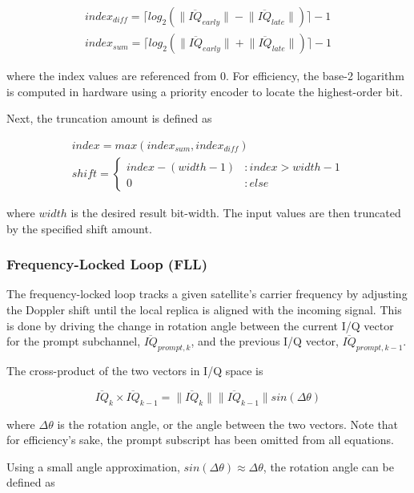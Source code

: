 \documentclass[12pt]{article}
\begin{document}
\begin{gather*}
index_{diff}=\lceil log_2(\lVert \overline{IQ}_{early} \rVert - \lVert \overline{IQ}_{late} \rVert) \rceil - 1 \\
index_{sum}=\lceil log_2(\lVert \overline{IQ}_{early} \rVert + \lVert \overline{IQ}_{late} \rVert) \rceil - 1
\end{gather*}

where the index values are referenced from 0. For efficiency, the base-2 logarithm is computed in hardware using a priority encoder to locate the highest-order bit.

Next, the truncation amount is defined as

\begin{gather*}
index=max(index_{sum},index_{diff}) \\
shift=\begin{cases} index-(width-1) & : index>width-1 \\
                                   0 & : else \end{cases}
\end{gather*}

where $width$ is the desired result bit-width. The input values are then truncated by the specified shift amount.

\subsubsection{Frequency-Locked Loop (FLL)}
\label{sec:fll}
The frequency-locked loop tracks a given satellite's carrier frequency by adjusting the Doppler shift until the local replica is aligned with the incoming signal. This is done by driving the change in rotation angle between the current I/Q vector for the prompt subchannel, $\overline{IQ}_{prompt,k}$, and the previous I/Q vector, $\overline{IQ}_{prompt,k-1}$.

The cross-product of the two vectors in I/Q space is

\begin{equation*}
\overline{IQ}_{k} \times \overline{IQ}_{k-1} = \lVert \overline{IQ}_{k} \rVert \lVert \overline{IQ}_{k-1} \rVert sin(\Delta \theta)
\end{equation*}

where $\Delta \theta$ is the rotation angle, or the angle between the two vectors. Note that for efficiency's sake, the prompt subscript has been omitted from all equations.

Using a small angle approximation, $sin(\Delta \theta) \approx \Delta \theta$, the rotation angle can be defined as
\end{document}
